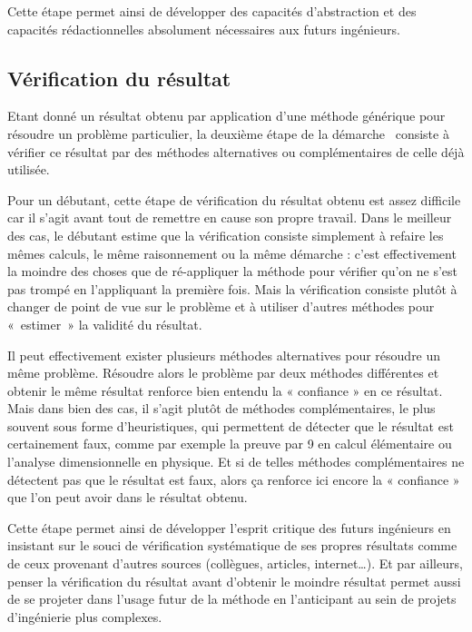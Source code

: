 \documentclass[11pt,a4paper,colorlinks,breaklinks]{article}
\begin{document}
Cette étape permet ainsi de développer des capacités d'abstraction et
des capacités rédactionnelles absolument nécessaires aux futurs ingénieurs.

\subsection{Vérification du résultat}\label{subsec:verification}
Etant donné un résultat obtenu par application d'une méthode générique pour 
résoudre un problème particulier, la deuxième étape de la démarche \mvr\ 
consiste à vérifier ce résultat
par des méthodes alternatives ou complémentaires de celle déjà utilisée.

Pour un débutant, cette étape de vérification du résultat obtenu est assez difficile
car il s'agit avant tout de remettre en cause son propre travail. 
Dans le meilleur des cas, le débutant estime que la vérification consiste simplement 
à refaire les mêmes calculs, le même raisonnement ou la même démarche : 
c'est effectivement la moindre des choses que de ré-appliquer la méthode pour vérifier 
qu'on ne s'est pas trompé en l'appliquant la première fois. 
Mais la vérification consiste plutôt à changer de point de vue sur le problème
et à utiliser d'autres méthodes pour «~estimer~» la validité du résultat.

Il peut effectivement exister plusieurs méthodes alternatives pour résoudre un même problème. Résoudre alors le problème par deux méthodes différentes et obtenir le même résultat renforce bien entendu la « confiance » en ce résultat.
Mais dans bien des cas, il s'agit plutôt de méthodes complémentaires, le plus souvent sous forme d'heuristiques, qui permettent de détecter que le résultat est certainement faux, comme par exemple la preuve par 9 en calcul élémentaire ou l'analyse dimensionnelle en physique. Et si de telles méthodes complémentaires ne détectent pas que le résultat est faux, alors ça renforce ici encore la « confiance » que l'on peut avoir dans le résultat obtenu.

Cette étape permet ainsi de développer l'esprit critique des futurs ingénieurs en insistant sur le souci de vérification systématique de ses propres résultats comme de ceux provenant d'autres sources (collègues, articles, internet\ldots). Et par ailleurs, penser la vérification du résultat avant d'obtenir le moindre résultat permet aussi de se projeter dans l'usage futur de la méthode en l'anticipant au sein de projets d'ingénierie plus complexes.
\end{document}
